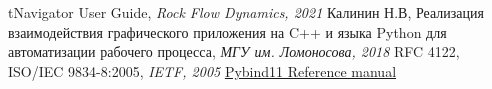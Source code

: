 \documentclass[specialist, subf, href, colorlinks=true, 14pt, times, mtpro, final]{disser}
\theoremstyle{definition}
\begin{document}
	
	
	\tableofcontents
	\newpage
	
	
	
	
	
	

	\newpage
	\begin{thebibliography}{100}
		 tNavigator User Guide, \emph{Rock Flow Dynamics, 2021}
		 Калинин Н.В, Реализация взаимодействия графического приложения на C++ и языка Python для автоматизации рабочего процесса, \emph{МГУ им. Ломоносова, 2018}
		 RFC 4122, ISO/IEC 9834-8:2005, \emph{IETF, 2005}
		 \href {https://pybind11.readthedocs.io/en/stable/} {Pybind11 Reference manual}

	\end{thebibliography}
\end{document}
